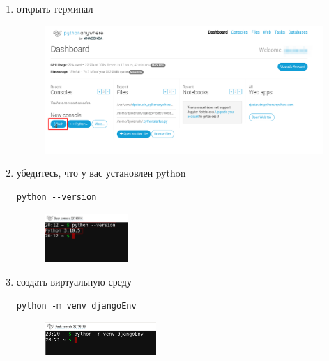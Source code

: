 \documentclass[12pt]{article}
\begin{document}
	\begin{enumerate}
    \item открыть терминал
	\begin{figure}[H]
		\centering
		\includegraphics[width=1.0\textwidth ,keepaspectratio]{imgs/open_terminal.png}
		\caption{}
	\end{figure}

    \item убедитесь, что у вас установлен python
			\begin{lstlisting}[caption=\phantom{},style=conlst,label={lst:enter_desktop}]
      python --version
			\end{lstlisting}
	\begin{figure}[H]
		\centering
		\includegraphics[width=0.3\textwidth ,keepaspectratio]{imgs/verify_py_version.png}
		\caption{}
	\end{figure}

    \item создать виртуальную среду
			\begin{lstlisting}[caption=\phantom{},style=conlst,label={lst:enter_desktop}]
python -m venv djangoEnv
			\end{lstlisting}
	\begin{figure}[H]
		\centering
		\includegraphics[width=0.4\textwidth ,keepaspectratio]{imgs/create_venv.png}
		\caption{}
	\end{figure}


\end{enumerate}
\end{document}
